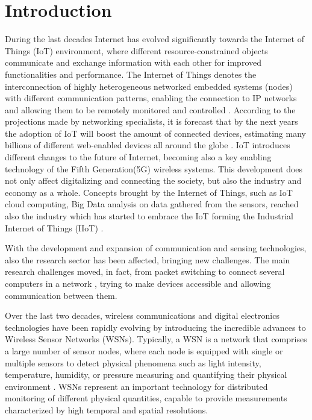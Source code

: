 \chapter{Introduction}
\label{ch:introduction}

During the last decades Internet has evolved significantly towards the Internet of Things (\acs{IoT}) environment, where  different resource-constrained objects  communicate and exchange information with each other for improved functionalities and performance. 
The Internet of Things denotes the interconnection of highly  heterogeneous  networked  embedded systems  (nodes)  with different communication patterns, enabling the connection to IP networks and allowing them to be remotely monitored and controlled \cite{Heer2011}.
According to the projections made by networking specialists, it is forecast that by the next years the adoption of \acs{IoT} will boost the amount of connected devices, estimating many billions of different web-enabled devices all around the globe\cite{Chen2014} \cite{CiscoInternetBusinessSolutionsGroupIBSG2011TheEverything}.
IoT introduces different changes to the future of Internet, becoming also a key enabling technology of the Fifth Generation(\acs{5G}) wireless systems.
This development does not only affect digitalizing and connecting the society, but also the industry and economy as a whole. 
Concepts brought by the Internet of Things, such as IoT cloud computing, Big Data analysis on data gathered from the sensors, reached also the industry which has started to embrace the IoT forming the Industrial Internet of Things (\acs{IIoT}) \cite{Shrouf2014SmartParadigm}.

With the development and expansion of communication and sensing technologies, also the research sector has been affected, bringing new challenges.
The main research challenges moved, in fact, from packet switching to connect several computers in a network \cite{Barry2015BriefInternet}, trying to make devices accessible and allowing communication between them.

Over the last two decades, wireless communications and digital electronics technologies have been rapidly evolving by introducing the incredible advances to Wireless Sensor Networks (\acsp{WSN}).
Typically, a \acs{WSN} is a network that comprises a large number of sensor nodes, where each node is equipped with single or multiple sensors to detect physical phenomena such as light intensity, temperature, humidity, or pressure measuring and quantifying their physical environment \cite{Akyildiz2002WirelessSurvey}.
\acsp{WSN} represent an important technology for distributed monitoring of different physical quantities, capable to provide measurements characterized by high temporal and spatial resolutions.



